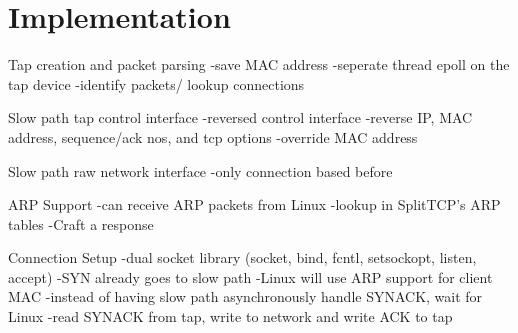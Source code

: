 \section{Implementation}

Tap creation and packet parsing
 -save MAC address
 -seperate thread epoll on the tap device
 -identify packets/ lookup connections

Slow path tap control interface
 -reversed control interface
  -reverse IP, MAC address, sequence/ack nos, and tcp options
 -override MAC address

Slow path raw network interface
 -only connection based before

ARP Support
 -can receive ARP packets from Linux
 -lookup in SplitTCP's ARP tables
 -Craft a response

Connection Setup
 -dual socket library (socket, bind, fcntl, setsockopt, listen, accept)
 -SYN already goes to slow path
 -Linux will use ARP support for client MAC
 -instead of having slow path asynchronously handle SYNACK, wait for Linux
 -read SYNACK from tap, write to network and write ACK to tap


